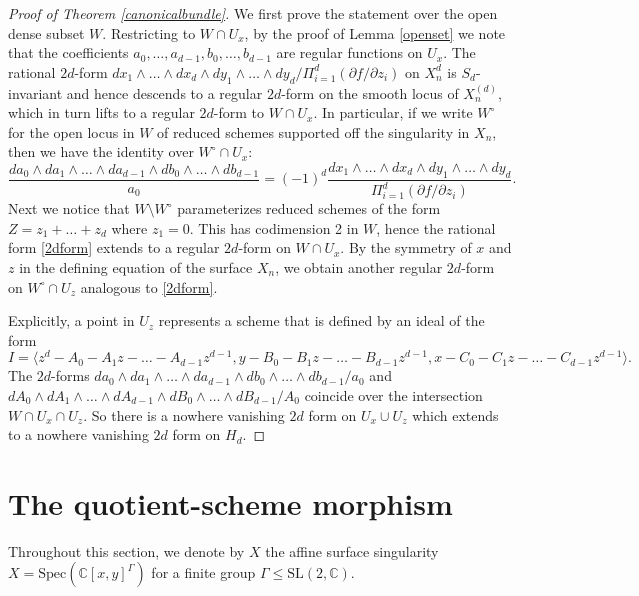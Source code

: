 \documentclass{amsart}[12pt]
\theoremstyle{definition}
\theoremstyle{remark}
\numberwithin{equation}{section}
\begin{document}
\begin{proof}[Proof of Theorem \ref{canonicalbundle}]
We first prove the statement over the open dense subset $W$. Restricting to $W \cap U_x$, by the proof of Lemma \ref{openset} we note that the coefficients $a_0, \dots, a_{d - 1}, b_0, \dots, b_{d - 1}$ are regular functions on $U_x$. The rational $2d$-form $dx_1 \wedge \dots \wedge dx_d \wedge dy_1 \wedge \dots \wedge dy_d / \Pi_{i = 1}^d(\partial f / \partial z_i)$ on $X_n^{d}$ is $S_d$-invariant and hence descends to a regular $2d$-form on the smooth locus of $X_n^{(d)}$, which in turn lifts to a regular $2d$-form to $W \cap U_x$. In particular, if we write $W^{\circ}$ for the open locus in $W$ of reduced schemes supported off the singularity in $X_n$, then we have the identity over $W^{\circ} \cap U_x$:
\begin{equation}\label{2dform}
\dfrac{d a_0 \wedge d a_1 \wedge \dots \wedge da_{d - 1} \wedge db_0 \wedge \dots \wedge db_{d - 1}}{a_0} = (-1)^{d} \dfrac{dx_1 \wedge \dots \wedge dx_d \wedge dy_1 \wedge \dots \wedge dy_d}{\Pi_{i = 1}^d(\partial f / \partial z_i)}.
\end{equation}
Next we notice that $W \setminus W^{\circ}$ parameterizes reduced schemes of the form $Z = z_1 +  \dots + z_d$ where $z_1 = 0$. This has codimension 2 in $W$, hence the rational form \ref{2dform} extends to a regular $2d$-form on $W \cap U_x$. By the symmetry of $x$ and $z$ in the defining equation of the surface $X_n$, we obtain another regular $2d$-form on $W^{\circ} \cap U_z$ analogous to \ref{2dform}. 

Explicitly, a point in $U_z$ represents a scheme that is defined by an ideal of the form 
\[ I = \langle  z^d - A_0 - A_1z - \dots - A_{d - 1}z^{d - 1}, y - B_0 - B_1z - \dots - B_{d - 1}z^{d - 1}, x - C_0 - C_1z - \dots - C_{d - 1}z^{d - 1}\rangle.
\]
The $2d$-forms $d a_0 \wedge d a_1 \wedge \dots \wedge da_{d - 1} \wedge db_0 \wedge \dots \wedge db_{d - 1}/a_0$ and $d A_0 \wedge d A_1 \wedge \dots \wedge dA_{d - 1} \wedge dB_0 \wedge \dots \wedge dB_{d - 1}/A_0$ coincide over the intersection $W \cap U_x \cap U_z$. So there is a nowhere vanishing $2d$ form on $U_x \cup U_z$ which extends to a nowhere vanishing $2d$ form on $H_d$.
\end{proof}



\section{The quotient-scheme morphism}
Throughout this section, we denote by $X$ the affine surface singularity $X = \mathrm{Spec}(\mathbb{C}[x, y]^{\Gamma})$ for a finite group $\Gamma \leq \mathrm{SL}(2, \mathbb{C})$. 
\end{document}
